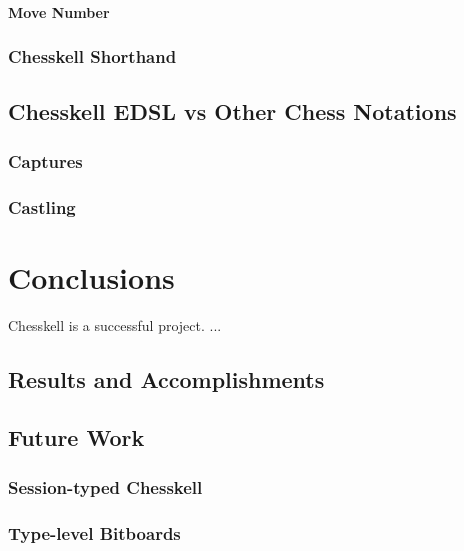 \documentclass[12pt, a4paper, bibliography=totocnumbered]{scrreprt}
\begin{document}
\subsubsection{Move Number}

\subsection{Chesskell Shorthand} \label{shorthand}

\section{Chesskell EDSL vs Other Chess Notations}

\subsection{Captures}

\subsection{Castling}


\chapter{Conclusions}

Chesskell is a successful project. ...

\section{Results and Accomplishments}

\section{Future Work}

\subsection{Session-typed Chesskell}

\subsection{Type-level Bitboards}

\end{document}
